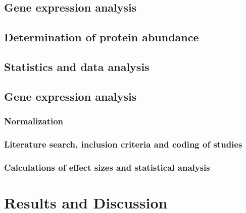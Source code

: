 \documentclass[twoside,10pt]{gihclass} %
\begin{document}
\hypertarget{gene-expression-analysis}{%
\section{Gene expression analysis}\label{gene-expression-analysis}}

\hypertarget{determination-of-protein-abundance}{%
\section{Determination of protein abundance}\label{determination-of-protein-abundance}}

\hypertarget{statistics-and-data-analysis}{%
\section{Statistics and data analysis}\label{statistics-and-data-analysis}}

\hypertarget{gene-expression-analysis-1}{%
\section{Gene expression analysis}\label{gene-expression-analysis-1}}

\hypertarget{normalization}{%
\subsection{Normalization}\label{normalization}}

\hypertarget{literature-search-inclusion-criteria-and-coding-of-studies}{%
\subsection{Literature search, inclusion criteria and coding of studies}\label{literature-search-inclusion-criteria-and-coding-of-studies}}

\hypertarget{calculations-of-effect-sizes-and-statistical-analysis}{%
\subsection{Calculations of effect sizes and statistical analysis}\label{calculations-of-effect-sizes-and-statistical-analysis}}

\hypertarget{results-and-discussion}{%
\chapter{Results and Discussion}\label{results-and-discussion}}
\end{document}
